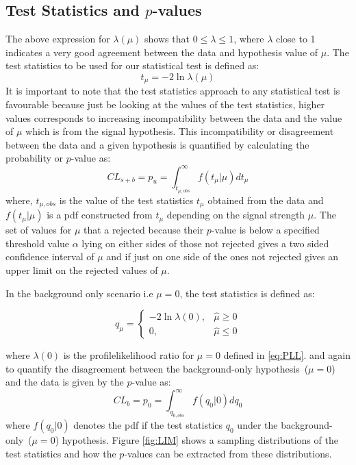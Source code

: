 \subsection{Test Statistics and $p$-values}
\par
The above expression for $\lambda(\mu)$ shows that $0 \leq \lambda \leq 1$, where $\lambda$ close to 1 indicates a very good agreement between the data and hypothesis value of $\mu$.
The test statistics  to be used for our statistical test is defined as:
\begin{equation}
 t_{\mu} = -2\ln \lambda(\mu)
\end{equation}
It is important to note that the test statistics approach to any statistical test is favourable because just be looking at the values of the test statistics, higher values corresponds to increasing incompatibility between the data and the value of $\mu$ which is from the signal hypothesis. 
This incompatibility or disagreement between the data and a given hypothesis is quantified by calculating the probability or $p$-value as:
\begin{equation}
 CL_{s+b} = p_{u} = \int^{\infty}_{t_{\mu,obs}} f(t_{\mu}|\mu) dt_{\mu}
\end{equation}
where, $t_{\mu,obs}$ is the value of the test statistics $t_{\mu}$ obtained from the data and $f(t_{\mu}|\mu)$ is a pdf constructed from $t_{\mu}$ depending on the signal strength $\mu$.
The set of values for $\mu$ that a rejected because their $p$-value is below a specified threshold value $\alpha$
lying on either sides of those not rejected gives a two sided confidence interval of $\mu$ and if just on one side of the ones not rejected gives an upper limit on the rejected values of $\mu$.

In the background only scenario i.e $\mu = 0$, the test statistics is defined as:

\[\label{eq:HNULL}
 q_{\mu} = \left\lbrace  
  \begin{array}{ll}
 -2\ln \lambda(0), & \hat{\mu} \geq 0 \\
   0,              & \hat{\mu} \leq 0
  \end{array}
  \right.
\]

where $\lambda(0)$ is the profilelikelihood ratio for $\mu = 0$  defined in \ref{eq:PLL}.
and again to quantify the disagreement between the background-only hypothesis~($\mu = 0$) and the data is given by the $p$-value as:
\begin{equation}
 CL_{b} = p_{0} = \int^{\infty}_{q_{0,obs}} f(q_{0}|0) dq_{0}
\end{equation}
where $f(q_{0}|0)$ denotes the pdf if the test statistics $q_{0}$ under the background-only~($\mu = 0$) hypothesis.
Figure \ref{fig:LIM} shows a sampling distributions of the test statistics and how the $p$-values can be extracted from these distributions.

